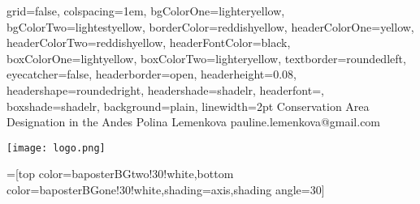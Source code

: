 \documentclass[a0paper,landscape,final]{baposter}
\begin{document}
\begin{poster}{
  grid=false,
  colspacing=1em,
  bgColorOne=lighteryellow,
  bgColorTwo=lightestyellow,
  borderColor=reddishyellow,
  headerColorOne=yellow,
  headerColorTwo=reddishyellow,
  headerFontColor=black,
  boxColorOne=lightyellow,
  boxColorTwo=lighteryellow,
  textborder=roundedleft,
  eyecatcher=false,
  headerborder=open,
  headerheight=0.08\textheight,
  headershape=roundedright,
  headershade=shadelr,
  headerfont=\Large\textsf, %
  boxshade=shadelr,
  background=plain,
  linewidth=2pt
  }
  {} %
  {\sf %
Conservation Area Designation in the Andes}
  {\sf %
Polina Lemenkova\hspace{3em}
pauline.lemenkova@gmail.com\hspace{3em}
}
{{\begin{minipage}{20em}
    \hfill
    \texttt{[image: logo.png]}
  \end{minipage}}
  }

  =[top color=baposterBGtwo!30!white,bottom color=baposterBGone!30!white,shading=axis,shading angle=30]

     \newlength{\leftimgwidth}
     \setlength{\leftimgwidth}{0.78em+8.0em}

    \newcommand{\colouredcircle}[1]{%
      \tikz{\useasboundingbox (-0.2em,-0.32em) rectangle(0.2em,0.32em); \draw[draw=black,fill=baposterBGone!80!black!#1!white,line width=0.03em] (0,0) circle(0.18em);}}



 

\end{poster}
\end{document}
